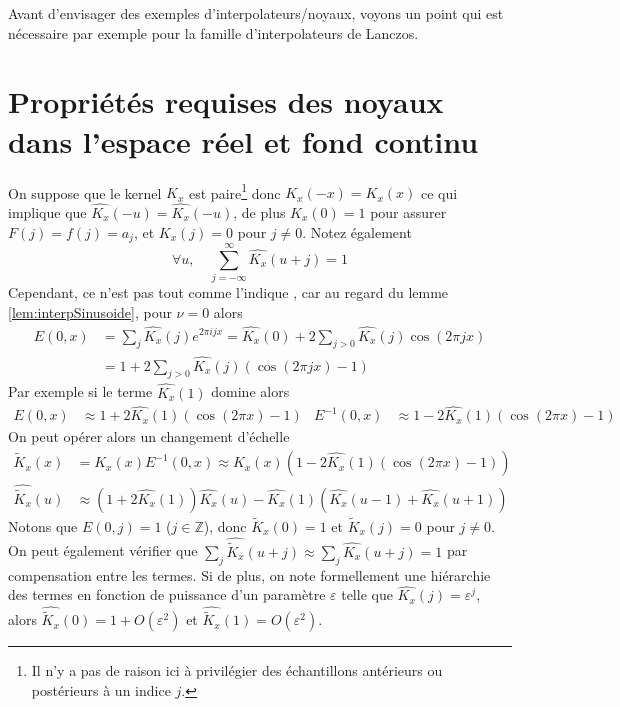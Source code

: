\documentclass[11pt,twoside]{article}
\newcommand{\nn}{\nonumber}
\begin{document}
Avant d'envisager des exemples d'interpolateurs/noyaux, voyons un point qui est nécessaire par exemple pour la famille d'interpolateurs de Lanczos.
%
\section{Propriétés requises des noyaux dans l'espace réel et fond continu}
\label{sec:kernel-freq0}
%
On suppose que le kernel $K_x$ est paire\footnote{Il n'y a pas de raison ici à privilégier des échantillons antérieurs ou postérieurs à un indice $j$.} donc $K_x(-x)=K_x(x)$ ce qui implique que $\hat{K_x}(-u) = \hat{K_x}(-u)$, de plus $K_x(0)=1$ pour assurer $F(j)=f(j)=a_j$, et $K_x(j)=0$ pour $j\neq 0$. Notez également 
\begin{equation}
\forall u, \quad \sum_{j=-\infty}^{\infty} \hat{K_x}(u+j) = 1
\end{equation} 
Cependant, ce n'est pas tout comme l'indique \cite{2014PASP..126..287B}, car au regard du lemme \ref{lem:interpSinusoide}, pour $\nu=0$ alors
\begin{align}
E(0,x) &= \sum_j \hat{K_x}(j) e^{2\pi i j x}
= \hat{K_x}(0) + 2\sum_{j>0}\hat{K_x}(j) \cos(2\pi j x) \nn\\
&= 1+2\sum_{j>0}\hat{K_x}(j)(\cos(2\pi j x)-1)
\end{align}
Par exemple si le terme $\hat{K_x}(1)$ domine alors
\begin{align}
E(0,x) &\approx 1 + 2 \hat{K_x}(1)(\cos(2\pi  x)-1) & 
E^{-1}(0,x) &\approx 1 - 2 \hat{K_x}(1)(\cos(2\pi  x)-1)
\end{align}
On peut opérer alors un changement d'échelle
\begin{align}
\tilde{K}_x(x) &= K_x(x) E^{-1}(0,x) \approx  K_x(x)( 1 - 2 \hat{K_x}(1)(\cos(2\pi  x)-1)) \nn\\
\widehat{\tilde{K}_x}(u) &\approx (1+2\hat{K_x}(1)) \hat{K_x}(u) - \hat{K_x}(1)(\hat{K_x}(u-1)+\hat{K_x}(u+1))
\label{eq:kernel-rescaling}
\end{align}
Notons que $E(0,j)=1$ ($j\in\mathbb{Z}$), donc $\tilde{K}_x(0)=1$ et $\tilde{K}_x(j)=0$ pour $j\neq 0$. On peut également vérifier que $\sum_j \widehat{\tilde{K}_x}(u+j)\approx \sum_j \hat{K_x}(u+j)=1$ par compensation entre les termes. Si de plus, on note formellement une hiérarchie des termes en fonction de puissance d'un paramètre $\varepsilon$ telle que $\hat{K_x}(j)=\varepsilon^j$, alors $\widehat{\tilde{K}_x}(0)= 1+O(\varepsilon^2)$ et $\widehat{\tilde{K}_x}(1)=O(\varepsilon^2)$. 
\end{document}
